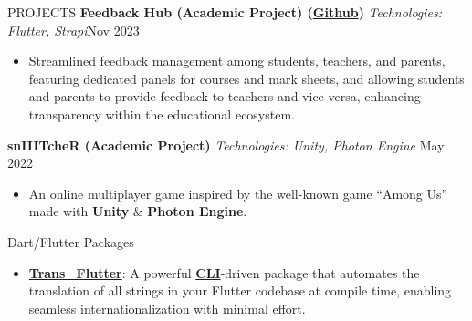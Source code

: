 \documentclass{resume}
\begin{document}
\begin{rSection}{PROJECTS}
    \textbf{Feedback Hub (Academic Project) (\href{https://github.com/ShivanshuKGupta/feedback_hub}{Github})} \textit{Technologies: Flutter, Strapi}\hfill Nov 2023
    \begin{itemize}
        \itemsep -3pt {}
        \item Streamlined feedback management among students, teachers, and parents, featuring dedicated panels for courses and mark sheets, and allowing students and parents to provide feedback to teachers and vice versa, enhancing transparency within the educational ecosystem.
    \end{itemize}

    \textbf{snIIITcheR (Academic Project)} \textit{Technologies: Unity, Photon Engine} \hfill May 2022
    \begin{itemize}
        \itemsep -3pt {}
        \item An online multiplayer game inspired by the well-known game “Among Us” made with \textbf{Unity} \& \textbf{Photon Engine}.
    \end{itemize}
\end{rSection}

\begin{rSection}{Dart/Flutter Packages}
    \begin{itemize}
        \itemsep -3pt {}
        \item \textbf{\href{https://pub.dev/packages/trans_flutter}{Trans\_Flutter}}: A powerful \textbf{\href{https://pub.dev/packages/fluttertrans}{CLI}}-driven package that automates the translation of all strings in your Flutter codebase at compile time, enabling seamless internationalization with minimal effort.

    \end{itemize}
\end{rSection}
\end{document}
